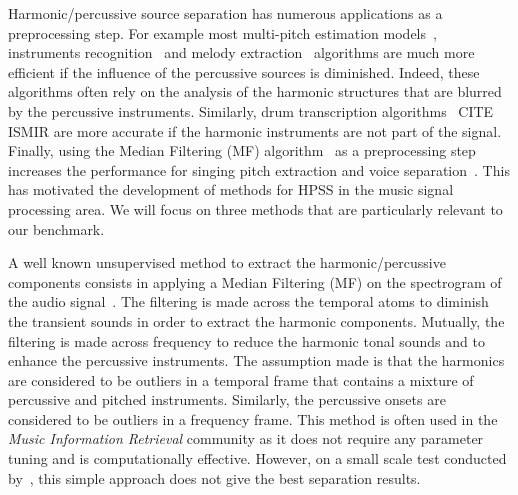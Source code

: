Harmonic/percussive source separation has numerous applications as a preprocessing step. For example most multi-pitch estimation models~\cite{klapuri2008multipitch}, instruments recognition~\cite{eronen2000musical} and melody extraction~\cite{salamon2012melody} algorithms are much more efficient if the influence of the percussive sources is diminished. Indeed, these algorithms often rely on the analysis of the harmonic structures that are blurred by the percussive instruments. Similarly, drum transcription algorithms~\cite{paulus2005drum} CITE ISMIR are more accurate if the harmonic instruments are not part of the signal. Finally, using the Median Filtering (MF) algorithm~\cite{fitzgerald2010harmonic} as a preprocessing step increases the performance for singing pitch extraction and voice separation~\cite{hsu2012tandem}. This has motivated the development of methods for HPSS in the music signal processing area. We will focus on three methods that are particularly relevant to our benchmark. 


A well known unsupervised method to extract the harmonic/percussive components consists in applying a Median Filtering (MF) on the spectrogram of the audio signal~\cite{fitzgerald2010harmonic}. The filtering is made across the temporal atoms to diminish the transient sounds in order to extract the harmonic components. Mutually, the filtering is made across frequency to reduce the harmonic tonal sounds and to enhance the percussive instruments. The assumption made is that the harmonics are considered to be outliers in a temporal frame that contains a mixture of percussive and pitched instruments. Similarly, the percussive onsets are considered to be outliers in a frequency frame. This method is often used in the \emph{Music Information Retrieval} community as it does not require any parameter tuning and is computationally effective. However, on a small scale test conducted by~\cite{canadas2014percussive}, this simple approach does not give the best separation results.%


